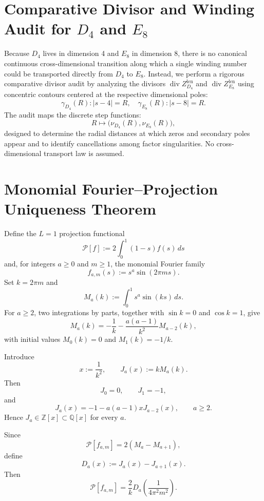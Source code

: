 \documentclass{article}
\begin{document}
\section{Comparative Divisor and Winding Audit for $D_4$ and $E_8$}

Because $D_4$ lives in dimension 4 and $E_8$ in dimension 8, there is no canonical continuous cross-dimensional transition along which a single winding number could be transported directly from $D_4$ to $E_8$. Instead, we perform a rigorous comparative divisor audit by analyzing the divisors $\operatorname{div} Z_{D_4}^{\mathrm{len}}$ and $\operatorname{div} Z_{E_8}^{\mathrm{len}}$ using concentric contours centered at the respective dimensional poles:
\[
\gamma_{D_4}(R): |s-4|=R, \quad \gamma_{E_8}(R): |s-8|=R.
\]
The audit maps the discrete step functions:
\[
R \mapsto \bigl(\nu_{D_4}(R), \nu_{E_8}(R)\bigr),
\]
designed to determine the radial distances at which zeros and secondary poles appear and to identify cancellations among factor singularities. No cross-dimensional transport law is assumed.



\section{Monomial Fourier--Projection Uniqueness Theorem}

Define the $L=1$ projection functional
\[
\mathcal P[f] := 2\int_0^1 (1-s)f(s)\,ds
\]
and, for integers $a\ge 0$ and $m\ge 1$, the monomial Fourier family
\[
f_{a,m}(s):=s^a\sin(2\pi m s).
\]
Set $k=2\pi m$ and
\[
M_a(k):=\int_0^1 s^a\sin(ks)\,ds.
\]
For $a\ge2$, two integrations by parts, together with $\sin k=0$ and $\cos k=1$, give
\begin{equation}
M_a(k)=-\frac1k-\frac{a(a-1)}{k^2}M_{a-2}(k),
\end{equation}
with initial values $M_0(k)=0$ and $M_1(k)=-1/k$.

Introduce
\[
x:=\frac1{k^2},\qquad J_a(x):=kM_a(k).
\]
Then
\[
J_0=0,\qquad J_1=-1,
\]
and
\begin{equation}
J_a(x)=-1-a(a-1)xJ_{a-2}(x),\qquad a\ge2.
\end{equation}
Hence $J_a\in\mathbb Z[x]\subset\mathbb Q[x]$ for every $a$.

Since
\[
\mathcal P[f_{a,m}]=2(M_a-M_{a+1}),
\]
define
\[
D_a(x):=J_a(x)-J_{a+1}(x).
\]
Then
\begin{equation}
\mathcal P[f_{a,m}]=\frac{2}{k}D_a\!\left(\frac{1}{4\pi^2m^2}\right).
\end{equation}
\end{document}
